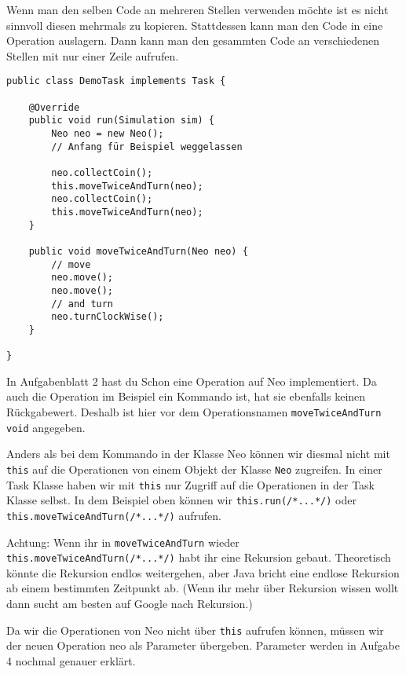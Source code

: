\begin{Infobox}
	Wenn man den selben Code an mehreren Stellen verwenden möchte ist es nicht sinnvoll diesen mehrmals zu kopieren. 
	Stattdessen kann man den Code in eine Operation auslagern. 
	Dann kann man den gesammten Code an verschiedenen Stellen mit nur einer Zeile aufrufen.
	
	\vspace*{0.3cm}
	\hfill
    \begin{minipage}{.96\textwidth}
	\begin{lstlisting}
public class DemoTask implements Task {
    
    @Override
    public void run(Simulation sim) {
        Neo neo = new Neo();
        // Anfang für Beispiel weggelassen
        
        neo.collectCoin();
        this.moveTwiceAndTurn(neo);
        neo.collectCoin();
        this.moveTwiceAndTurn(neo);
    }
    
    public void moveTwiceAndTurn(Neo neo) {
        // move
        neo.move();
        neo.move();
        // and turn
        neo.turnClockWise();
    }
    
}
	\end{lstlisting}
	\end{minipage}

	In Aufgabenblatt 2 hast du Schon eine Operation auf Neo implementiert.
	Da auch die Operation im Beispiel ein Kommando ist, hat sie ebenfalls keinen Rückgabewert.
	Deshalb ist hier vor dem Operationsnamen \lstinline{moveTwiceAndTurn} \lstinline{void} angegeben.

	Anders als bei dem Kommando in der Klasse Neo können wir diesmal nicht mit \lstinline{this} auf die Operationen von einem Objekt der Klasse \lstinline{Neo} zugreifen.
	In einer Task Klasse haben wir mit \lstinline{this} nur Zugriff auf die Operationen in der Task Klasse selbst.
	In dem Beispiel oben können wir \lstinline{this.run(/*...*/)} oder \lstinline{this.moveTwiceAndTurn(/*...*/)} aufrufen.

	Achtung: Wenn ihr in \lstinline{moveTwiceAndTurn} wieder \lstinline{this.moveTwiceAndTurn(/*...*/)} habt ihr eine Rekursion gebaut.
	Theoretisch könnte die Rekursion endlos weitergehen, aber Java bricht eine endlose Rekursion ab einem bestimmten Zeitpunkt ab.
	(Wenn ihr mehr über Rekursion wissen wollt dann sucht am besten auf Google nach Rekursion.)

	Da wir die Operationen von Neo nicht über \lstinline{this} aufrufen können, müssen wir der neuen Operation neo als Parameter übergeben.
	Parameter werden in Aufgabe 4 nochmal genauer erklärt.
\end{Infobox}


